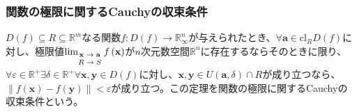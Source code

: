\documentclass[dvipdfmx]{jsarticle}
\begin{document}
\subsubsection{関数の極限に関するCauchyの収束条件}%
\begin{thm}[関数の極限に関するCauchyの収束条件]\label{4.1.10.14}
$D(f) \subseteq R \subseteq \mathbb{R}^{m}$なる関数$f:D(f) \rightarrow \mathbb{R}_{\infty}^{n}$が与えられたとき、$\forall\mathbf{a} \in \mathrm{cl}_{R}{D(f)}$に対し、極限値$\lim_{\scriptsize \begin{matrix} \mathbf{x} \rightarrow \mathbf{a} \\ R \rightarrow S \\\end{matrix}}{f\left( \mathbf{x} \right)}$が$n$次元数空間$\mathbb{R}^{n}$に存在するならそのときに限り、$\forall\varepsilon \in \mathbb{R}^{+}\exists\delta \in \mathbb{R}^{+}\forall\mathbf{x},\mathbf{y} \in D(f)$に対し、$\mathbf{x},\mathbf{y} \in U\left( \mathbf{a},\delta \right) \cap R$が成り立つなら、$\left\| f\left( \mathbf{x} \right) - f\left( \mathbf{y} \right) \right\| < \varepsilon$が成り立つ。この定理を関数の極限に関するCauchyの収束条件という。
\end{thm}
\end{document}
